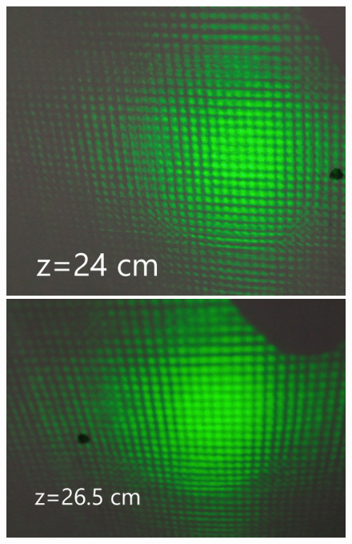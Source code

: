 \documentclass[a4paper,12pt]{article} %
\begin{document}
\begin{figure}[h]
\begin{center}
\begin{minipage}[h]{0.4\linewidth}
\includegraphics[width=1\linewidth]{45}
\caption{} %
\label{ris:experimoriginal} %
\end{minipage}
\hfill 
\begin{minipage}[h]{0.4\linewidth}
\includegraphics[width=1\linewidth]{46}
\caption{}
\label{ris:experimcoded}
\end{minipage}
\end{center}
\end{figure}
\end{document}

